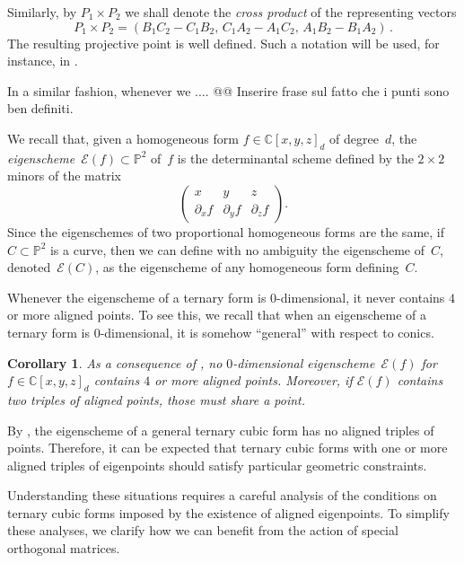 \documentclass[a4paper, 11pt, reqno]{amsart}
\theoremstyle{plain}
\newtheorem{corollary}[lemma]{Corollary}
\theoremstyle{definition}
\newcommand{\C}{\mathbb{C}}
\newcommand{\p}{\mathbb{P}}
\newcommand{\de}{\partial}
\newcommand{\Eig}[1]{\mathcal{E}\!\left( {#1} \right)}
\begin{document}
Similarly, by $P_1 \times P_2$ we shall denote the {\it cross product} of the representing vectors
%
\[
  P_1 \times P_2 = 
  (B_1 C_2 - C_1 B_2, \, C_1 A_2 - A_1 C_2, \, A_1 B_2 - B_1 A_2) \,.
\]
%
The resulting projective point is well defined. Such a notation will be used, for instance, in .

In a similar fashion, whenever we .... @@ Inserire frase sul fatto che i punti sono ben definiti.

We recall that, given a homogeneous form $f \in \C[x,y,z]_d$ of degree~$d$, the \emph{eigenscheme}~$\Eig{f} \subset \p^2$ of~$f$ is the determinantal scheme defined by the $2 \times 2$ minors of the matrix
%
\begin{equation}
\label{eq:def_matrix}
  \begin{pmatrix}
    x & y & z \\
    \de_x f & \de_y f & \de_z f
  \end{pmatrix}.
\end{equation}
%
Since the eigenschemes of two proportional homogeneous forms are the same,
if $C \subset \p^2$ is a curve, then we can define with no ambiguity the eigenscheme of~$C$, denoted~$\Eig{C}$, as the eigenscheme of any homogeneous form defining~$C$.

Whenever the eigenscheme of a ternary form is $0$-dimensional, it never contains $4$ or more aligned points.
To see this, we recall that when an eigenscheme of a ternary form is  $0$-dimensional, it is somehow ``general'' with respect to conics.

\begin{corollary}
\label{corollary:general_no_triple}
As a consequence of ,
no $0$-dimensional eigenscheme~$\Eig{f}$ for $f \in \C[x,y,z]_d$ contains $4$ or more aligned points.
Moreover, if $\Eig{f}$ contains two triples of aligned points, those must share a point.
\end{corollary}

By , the eigenscheme of a general ternary cubic form has no aligned triples of points. 
Therefore, it can be expected that ternary cubic forms with one or more aligned triples of eigenpoints should satisfy particular geometric constraints.

Understanding these situations requires a careful analysis of the conditions on ternary cubic forms imposed by the existence of aligned eigenpoints.
To simplify these analyses, we clarify how we can benefit from the action of special orthogonal matrices.
\end{document}
